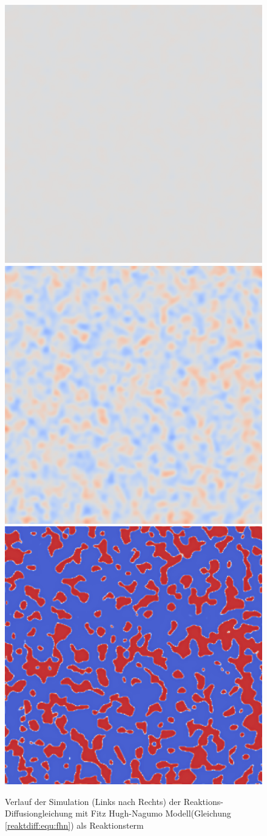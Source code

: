 \begin{figure}
    \centering
    \includegraphics[width=0.32\linewidth]{papers/reaktdiff/images/FitzHughNagumo/fhn_n1.png}
    \includegraphics[width=0.32\linewidth]{papers/reaktdiff/images/FitzHughNagumo/fhn_n300.png}
    \includegraphics[width=0.32\linewidth]{papers/reaktdiff/images/FitzHughNagumo/fhn_n999.png}
    \caption{Verlauf der Simulation (Links nach Rechts) der Reaktions-Diffusiongleichung mit Fitz Hugh-Nagumo Modell(Gleichung \eqref{reaktdiff:equ:fhn}) als Reaktionsterm}
    \label{reaktdiff:fig:fhn}
\end{figure}